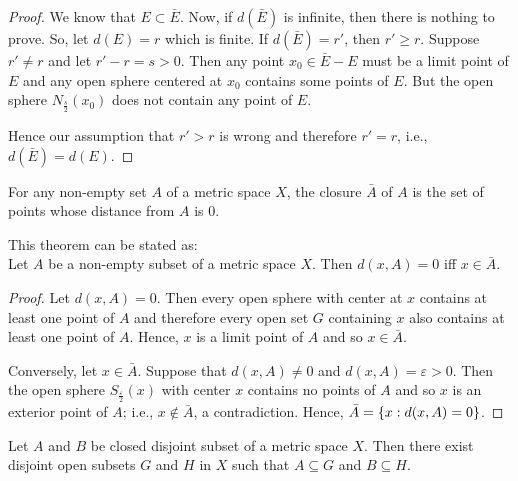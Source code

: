 \documentclass[../main-sheet.tex]{subfiles}
\begin{document}
\begin{proof}
    We know that \(E\subset \bar{E}\). Now, if \(d(\bar{E})\) is infinite, then there is nothing to prove. So, let \(d(E)=r\) which is finite. If \(d(\bar{E})=r'\), then \(r'\geq r\). Suppose \(r'\neq r\) and let \(r'-r=s>0\). Then any point \(x_0 \in \bar{E}-E\) must be a limit point of \(E\) and any open sphere centered at \(x_0\) contains some points of \(E\). But the open sphere \(N_{\frac{s}{2}}(x_0)\) does not contain any point of \(E\).

    Hence our assumption that \(r'> r\) is wrong and therefore \(r'=r\), i.e., \(d(\bar{E})=d(E)\).
\end{proof}
\begin{thm}
    For any non-empty set \(A\) of a metric space \(X\), the closure \(\bar{A}\) of \(A\) is the set of points whose distance from \(A\) is 0.
\end{thm}
This theorem can be stated as:\\
Let \(A\) be a non-empty subset of a metric space \(X\). Then \(d(x,A)=0\) iff \(x\in \bar{A}\).
\begin{proof}
    Let \(d(x,A)=0\). Then every open sphere with center at \(x\) contains at least one point of \(A\) and therefore every open set \(G\) containing  \(x\) also contains at least one point of \(A\). Hence, \(x\) is a limit point of \(A\) and so     \(x\in \bar{A}\).

    Conversely, let \(x\in\bar{A}\). Suppose that \(d(x,A)\neq 0\) and \(d(x,A)=\varepsilon >0\). Then the open sphere \(S_{\frac{\varepsilon}{2}}(x)\) with center \(x\) contains no points of \(A\) and so \(x\) is an exterior point of \(A\); i.e., \(x\notin \bar{A}\), a contradiction. Hence, \(\bar{A}=\left\{x:d(x,A)=0\right\}\).
\end{proof}
\begin{thm}
    Let \(A\) and \(B\) be closed disjoint subset of a metric space \(X\). Then there exist disjoint open subsets \(G\) and \(H\) in \(X\) such that \(A\subseteq G\) and \(B\subseteq H\).
\end{thm}
\end{document}
